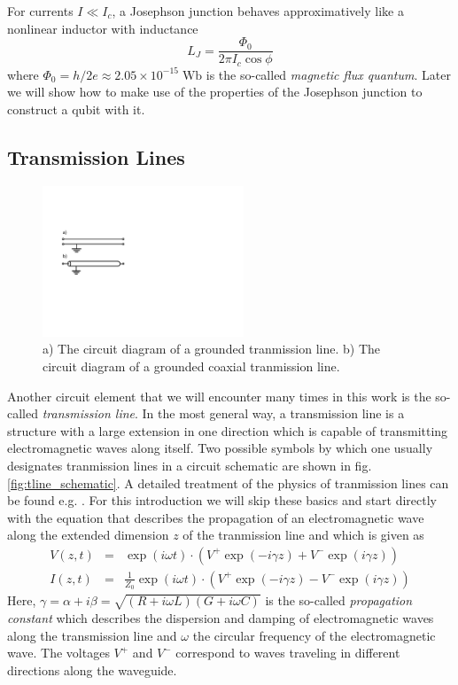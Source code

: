 \smallskip

For currents $I\ll I_c$, a Josephson junction behaves approximatively like a nonlinear inductor with inductance 
%
\begin{equation}
L_J = \frac{\Phi_0}{2\pi I_c \cos{\phi}}
\end{equation}
%
where $\Phi_0 = h/2e \approx 2.05 \times 10^{-15}\; \mathrm{Wb}$ is the so-called {\it magnetic flux quantum}. Later we will show how to make use of the properties of the Josephson junction to construct a qubit with it.

\subsection{Transmission Lines}

\begin{figure}
	\includegraphics[width=6cm]{"./material/figures/introduction/transmission_lines"}
	\caption{a) The circuit diagram of a grounded tranmission line. b) The circuit diagram of a grounded coaxial tranmission line.}
	\label{fig:SampleCircuit}
\end{figure}

Another circuit element that we will encounter many times in this work is the so-called {\it transmission line}. In the most general way, a transmission line is a structure with a large extension in one direction which is capable of transmitting electromagnetic waves along itself. Two possible symbols by which one usually designates tranmission lines in a circuit schematic are shown in fig. \ref{fig:tline_schematic}. A detailed treatment of the physics of tranmission lines can be found e.g. \cite{pozar_microwave_2011}. For this introduction we will skip these basics and start directly with the equation that describes the propagation of an electromagnetic wave along the extended dimension $z$ of the tranmission line and which is given as
%
\begin{eqnarray}
V(z,t) & = & \exp{\left(i\omega t\right)}\cdot\left(V^+ \exp{\left(-i\gamma z\right)}+V^-\exp{\left(i\gamma z\right)}\right) \\
I(z,t) & = & \frac{1}{Z_0}\exp{\left(i\omega t\right)}\cdot\left(V^+ \exp{\left(-i\gamma z\right)}-V^-\exp{\left(i\gamma z\right)}\right)
\end{eqnarray}
%
Here, $\gamma = \alpha+i\beta = \sqrt{(R+i\omega L)(G+i\omega C)}$ is the so-called {\it propagation constant} which describes the dispersion and damping of electromagnetic waves along the transmission line and $\omega$ the circular frequency of the electromagnetic wave. The voltages $V^+$ and $V^-$ correspond to waves traveling in different directions along the waveguide.

